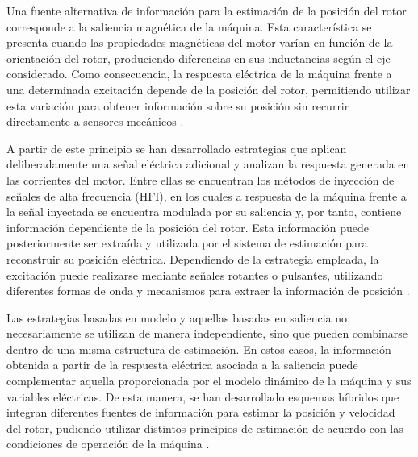 Una fuente alternativa de información para la estimación de la posición del rotor corresponde a la saliencia magnética de la máquina. Esta característica se presenta cuando las propiedades magnéticas del motor varían en función de la orientación del rotor, produciendo diferencias en sus inductancias según el eje considerado. Como consecuencia, la respuesta eléctrica de la máquina frente a una determinada excitación depende de la posición del rotor, permitiendo utilizar esta variación para obtener información sobre su posición sin recurrir directamente a sensores mecánicos \cite{wangOptimizedNonlinearHighFrequency2025}.

A partir de este principio se han desarrollado estrategias que aplican deliberadamente una señal eléctrica adicional y analizan la respuesta generada en las corrientes del motor. Entre ellas se encuentran los métodos de inyección de señales de alta frecuencia (HFI), en los cuales a respuesta de la máquina frente a la señal inyectada se encuentra modulada por su saliencia y, por tanto, contiene información dependiente de la posición del rotor. Esta información puede posteriormente ser extraída y utilizada por el sistema de estimación para reconstruir su posición eléctrica. Dependiendo de la estrategia empleada, la excitación puede realizarse mediante señales rotantes o pulsantes, utilizando diferentes formas de onda y mecanismos para extraer la información de posición \cite{wangPositionSensorlessPermanent2020,lascuPLLPositionSpeed2020}.
%
%
%
%
%
%
%
%

Las estrategias basadas en modelo y aquellas basadas en saliencia no necesariamente se utilizan de manera independiente, sino que pueden combinarse dentro de una misma estructura de estimación. En estos casos, la información obtenida a partir de la respuesta eléctrica asociada a la saliencia puede complementar aquella proporcionada por el modelo dinámico de la máquina y sus variables eléctricas. De esta manera, se han desarrollado esquemas híbridos que integran diferentes fuentes de información para estimar la posición y velocidad del rotor, pudiendo utilizar distintos principios de estimación de acuerdo con las condiciones de operación de la máquina \cite{wangOptimizedNonlinearHighFrequency2025}.

